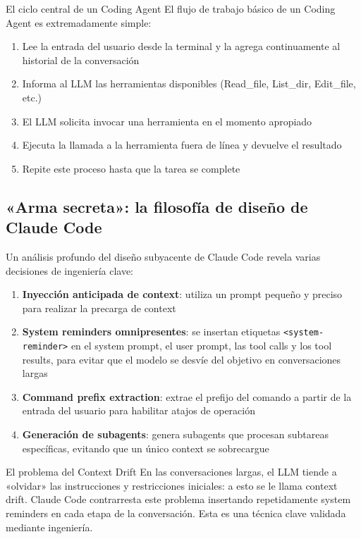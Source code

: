 \documentclass[a4paper]{article}
\begin{document}
\begin{importantbox}{El ciclo central de un Coding Agent}
El flujo de trabajo básico de un Coding Agent es extremadamente simple:
\begin{enumerate}
    \item Lee la entrada del usuario desde la terminal y la agrega continuamente al historial de la conversación
    \item Informa al LLM las herramientas disponibles (Read\_file, List\_dir, Edit\_file, etc.)
    \item El LLM solicita invocar una herramienta en el momento apropiado
    \item Ejecuta la llamada a la herramienta fuera de línea y devuelve el resultado
    \item Repite este proceso hasta que la tarea se complete
\end{enumerate}
\end{importantbox}

\subsection{«Arma secreta»: la filosofía de diseño de Claude Code}

Un análisis profundo del diseño subyacente de Claude Code revela varias decisiones de ingeniería clave:

\begin{enumerate}
    \item \textbf{Inyección anticipada de context}: utiliza un prompt pequeño y preciso para realizar la precarga de context
    \item \textbf{System reminders omnipresentes}: se insertan etiquetas \texttt{<system-reminder>} en el system prompt, el user prompt, las tool calls y los tool results, para evitar que el modelo se desvíe del objetivo en conversaciones largas
    \item \textbf{Command prefix extraction}: extrae el prefijo del comando a partir de la entrada del usuario para habilitar atajos de operación
    \item \textbf{Generación de subagents}: genera subagents que procesan subtareas específicas, evitando que un único context se sobrecargue
\end{enumerate}

\begin{warningbox}{El problema del Context Drift}
En las conversaciones largas, el LLM tiende a «olvidar» las instrucciones y restricciones iniciales: a esto se le llama context drift. Claude Code contrarresta este problema insertando repetidamente system reminders en cada etapa de la conversación. Esta es una técnica clave validada mediante ingeniería.
\end{warningbox}
\end{document}
